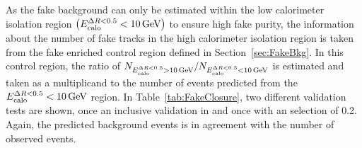 As the fake background can only be estimated within the low calorimeter isolation region $\left(E^{\Delta R<0.5}_{\text{calo}}<10\,\text{Ge}\kern-0.06667em\text{V}\right)$ to ensure high fake purity, 
the information about the number of fake tracks in the high calorimeter isolation region is taken from the fake enriched control region \fakeCR defined in Section~\ref{sec:FakeBkg}.
In this control region, the ratio of $N_{E^{\Delta R<0.5}_{\text{calo}}>10\,\text{Ge}\kern-0.06667em\text{V}}/N_{E^{\Delta R<0.5}_{\text{calo}}<10\,\text{Ge}\kern-0.06667em\text{V}}$ is estimated and taken as a multiplicand to the number of events predicted from the $E^{\Delta R<0.5}_{\text{calo}}<10\,\text{Ge}\kern-0.06667em\text{V}$ region.
In Table~\ref{tab:FakeClosure}, two different validation tests are shown, once an inclusive validation in \ias and once with an \ias selection of 0.2.
Again, the predicted background events is in agreement with the number of observed events.
\renewcommand{\arraystretch}{1.5}
\begin{table}[!b]
\centering
\caption{Validation test of fake and leptonic background estimation methods. Left: $\ecalo>10\gev$ . Right: $\ecalo>10\gev$ and $\ias>0.2$. Only statistical uncertainties are included.}
\label{tab:FakeClosure}
\end{table}
